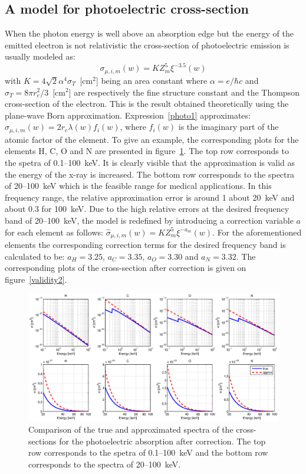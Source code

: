 \documentclass[12pt]{article}
\begin{document}
\subsection{A model for photoelectric cross-section}
When the photon energy is well above an absorption edge but the energy of the emitted
electron is not relativistic the cross-section of photoelectric emission is usually modeled as:
\begin{equation} 
 \sigma_{\mu,i,m}(w) = KZ^5_m\xi^{-3.5}(w) \label{photo1}
\end{equation}
with $K=4\sqrt{2}\alpha^4\sigma_T$~[cm$^2$] being an area constant where $\alpha=e/\hbar c$ and $\sigma_T=8\pi r_e^2/3$~[cm$^2$] are respectively the fine structure constant and the Thompson cross-section of the electron. This is the result obtained theoretically using the plane-wave Born approximation. Expression~\ref{photo1} approximates: $\sigma_{\mu,i,m}(w) = 2r_e\lambda(w)f_i(w)$, where $f_i(w)$ is the imaginary part of the atomic factor of the element. To give an example, the corresponding plots for the elements H, C, O and N are presented in figure~\ref{validity1}. The top row corresponds to the spetra of 0.1--100~keV. It is clearly visible that the approximation is valid as the energy of the x-ray is increased. The bottom row corresponds to the spectra of 20--100~keV which is the feasible range for medical applications. In this frequency range, the relative approximation error is around 1 about 20~keV and about 0.3 for 100~keV. Due to the high relative errors at the desired frequency band of 20--100~keV, the model is redefined by introducing a correction variable $a$ for each element as follows: $
 \hat\sigma_{\mu,i,m}(w) = KZ^5_m\xi^{-a_m}(w)$. For the aforementioned elements the corresponding correction terms for the desired frequency band is calculated to be: $a_H=3.25$, $a_C=3.35$, $a_O=3.30$ and $a_N=3.32$. The corresponding plots of the cross-section after correction is given on figure~\ref{validity2}.
\begin{figure}
\centering
\includegraphics[width=1\textwidth]{imgs/validity1.eps}
\caption{Comparison of the true and approximated spectra of the cross-sections for the photoelectric absorption after correction. The top row corresponds to the spetra of 0.1--100~keV and the bottom row corresponds to the spectra of 20--100~keV.}
\label{validity1}
\end{figure}
\end{document}
